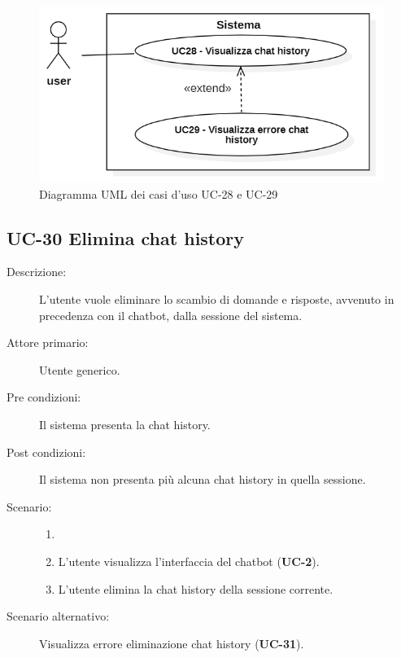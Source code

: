 \begin{figure}[H]
    \centering
    \includegraphics[width=0.9\linewidth]{UC28-29.PNG}
    \caption{Diagramma UML dei casi d'uso UC-28 e UC-29}
    \label{fig:UC28-29}
\end{figure}

\subsection{UC-30 Elimina chat history}
\begin{description}
    \item[Descrizione:] L'utente vuole eliminare lo scambio di domande e risposte, avvenuto in precedenza con il chatbot, dalla sessione del sistema.
    \item[Attore primario:] Utente generico.
    \item[Pre condizioni:] Il sistema presenta la chat history.
    \item[Post condizioni:] Il sistema non presenta più alcuna chat history in quella sessione.
    \item[Scenario:]
    \begin{enumerate}
        \item[] 
        \item L’utente visualizza l'interfaccia del chatbot (\textbf{UC-2}).
        \item L'utente elimina la chat history della sessione corrente.
    \end{enumerate}
    \item[Scenario alternativo:] Visualizza errore eliminazione chat history (\textbf{UC-31}).
\end{description}

